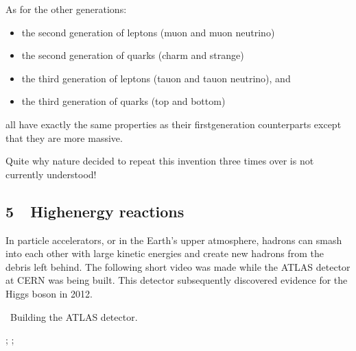 \documentclass[letterpaper,10pt,english]{sphinxmanual}
\begin{document}
As for the other generations:
\begin{itemize}
\item {} 
the second generation of leptons (muon and muon neutrino)

\item {} 
the second generation of quarks (charm and strange)

\item {} 
the third generation of leptons (tauon and tauon neutrino), and

\item {} 
the third generation of quarks (top and bottom)

\end{itemize}

all have exactly the same properties as their first\sphinxhyphen{}generation counterparts except that they are more massive.

Quite why nature decided to repeat this invention three times over is not currently understood!


\subsection{5  High\sphinxhyphen{}energy reactions}
\label{\detokenize{content/session_00/Part_00_05:5_xa0_xa0High-energy-reactions}}\label{\detokenize{content/session_00/Part_00_05::doc}}
In particle accelerators, or in the Earth’s upper atmosphere, hadrons can smash into each other with large kinetic energies and create new hadrons from the debris left behind. The following short video was made while the ATLAS detector at CERN was being built. This detector subsequently discovered evidence for the Higgs boson in 2012.

 Building the ATLAS detector.









 ; ;
\end{document}
